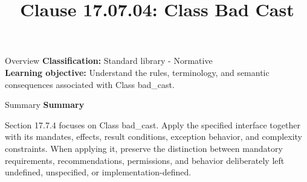 \documentclass[10pt,letterpaper]{article}
\title{Clause 17.07.04: Class Bad Cast}
\author{}
\date{}
\begin{document}
\maketitle
\begin{CornellOverviewBox}{Overview}
\textbf{Classification:} Standard library - Normative\\[2pt]
\textbf{Learning objective:} Understand the rules, terminology, and semantic consequences associated with Class bad\_cast.
\end{CornellOverviewBox}\begin{CornellSummaryBox}{Summary}
{\sffamily\bfseries\color{Accent} Summary}\par\vspace{3pt}Section 17.7.4 focuses on Class bad\_cast. Apply the specified interface together with its mandates, effects, result conditions, exception behavior, and complexity constraints. When applying it, preserve the distinction between mandatory requirements, recommendations, permissions, and behavior deliberately left undefined, unspecified, or implementation-defined.
\end{CornellSummaryBox}
\end{document}
